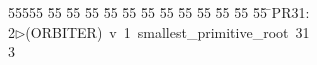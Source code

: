 %
%
\begin{tabbing}
55555 \= 55 \= 55 \= 55 \= 55 \= 55 \= 55 \= 55 \= 55 \= 55 \= 55 \= 55 \= 55 \= \>PR31:\\[0pt]
2\>$\triangleright$\>(ORBITER)\ v\ 1\ smallest\_primitive\_root\ 31\\[0pt]
3\>\end{tabbing}

